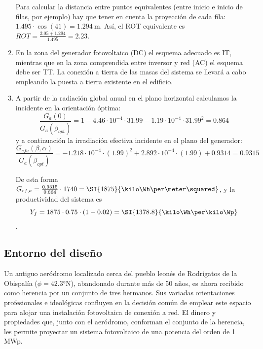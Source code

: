 \begin{enumerate}
  Para calcular la distancia entre puntos equivalentes (entre inicio e
  inicio de filas, por ejemplo) hay que tener en cuenta la proyección
  de cada fila: $1.495 \cdot \cos(41)=\SI{1.294}{\meter}$. Así, el ROT
  equivalente es $ROT=\frac{2.05+1.294}{1.495}=2.23$.

\item En la zona del generador fotovoltaico (DC) el esquema adecuado
  es IT, mientras que en la zona comprendida entre inversor y red (AC)
  el esquema debe ser TT. La conexión a tierra de las masas del
  sistema se llevará a cabo empleando la puesta a tierra existente en
  el edificio.

\item A partir de la radiación global anual en el plano horizontal
  calculamos la incidente en la orientación óptima:
  \[
  \frac{G_{a}(0)}{G_{a}(\beta_{opt})}=1-4.46\cdot10^{-4}\cdot 31.99 -
  1.19\cdot10^{-4}\cdot 31.99^{2}=0.864
  \]
  y a continuación la irradiación efectiva incidente en el plano del
  generador:
  \[
  \frac{G_{efa}(\beta,\alpha)}{G_{a}(\beta_{opt})} = -1.218 \cdot
  10^{-4} \cdot (1.99)^{2} + 2.892 \cdot 10^{-4} \cdot (1.99) + 0.9314
  = 0.9315
  \]

  De esta forma $G_{ef,a}=\frac{0.9315}{0.864} \cdot 1740 =
  \SI{1875}{\kilo\Wh\per\meter\squared}$, y la productividad del
  sistema es
  \[Y_f = 1875 \cdot 0.75 \cdot (1-0.02) =
  \SI{1378.8}{\kilo\Wh\per\kilo\Wp}\].


\end{enumerate}

\clearpage{}


\subsection{Entorno del diseño}

Un antiguo aeródromo localizado cerca del pueblo leonés de Rodrigatos
de la Obispalía ($\phi=\ang{42.3}\mathrm{N}$), abandonado durante
más de 50 años, es ahora recibido como herencia por un conjunto de
tres hermanos. Sus variadas orientaciones profesionales e ideológicas
confluyen en la decisión común de emplear este espacio para alojar
una instalación fotovoltaica de conexión a red. El dinero y propiedades
que, junto con el aeródromo, conforman el conjunto de la herencia,
les permite proyectar un sistema fotovoltaico de una potencia del
orden de 1 MWp.

